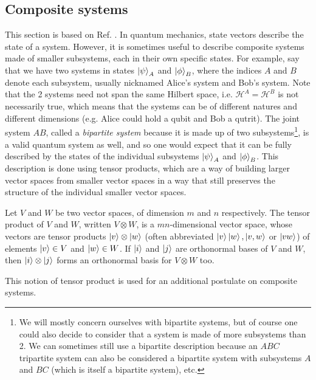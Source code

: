 \subsection{Composite systems}

This section is based on Ref. \cite[pp. 71--75, 93--96]{nielsen_quantum_2010}. In quantum mechanics, state vectors describe the state of a system. However, it is sometimes useful to describe composite systems made of smaller subsystems, each in their own specific states. For example, say that we have two systems in states $\ket{\psi}_A$ and $\ket{\phi}_B$, where the indices $A$ and $B$ denote each subsystem, usually nicknamed Alice's system and Bob's system. Note that the 2 systems need not span the same Hilbert space, i.e. $\mathcal{H}^A = \mathcal{H}^B$ is not necessarily true, which means that the systems can be of different natures and different dimensions (e.g. Alice could hold a qubit and Bob a qutrit). The joint system $AB$, called a \textit{bipartite system} because it is made up of two subsystems\footnote{We will mostly concern ourselves with bipartite systems, but of course one could also decide to consider that a system is made of more subsystems than 2. We can sometimes still use a bipartite description because an $ABC$ tripartite system can also be considered a bipartite system with subsystems $A$ and $BC$ (which is itself a bipartite system), etc.}, is a valid quantum system as well, and so one would expect that it can be fully described by the states of the individual subsystems $\ket{\psi}_A$ and $\ket{\phi}_B$. This description is done using tensor products, which are a way of building larger vector spaces from smaller vector spaces in a way that still preserves the structure of the individual smaller vector spaces.

\begin{definition}
    Let $V$ and $W$ be two vector spaces, of dimension $m$ and $n$ respectively. The tensor product of $V$ and $W$, written $V \otimes W$, is a $mn$-dimensional vector space, whose vectors are tensor products $\ket{v} \otimes \ket{w}$ (often abbreviated $\ket{v}\ket{w}, \ket{v, w}$ or $\ket{vw}$) of elements $\ket{v} \in V$ and $\ket{w} \in W$. If $\ket{i}$ and $\ket{j}$ are orthonormal bases of $V$ and $W$, then $\ket{i} \otimes \ket{j}$ forms an orthonormal basis for $V \otimes W$ too.
\end{definition}

\noindent This notion of tensor product is used for an additional postulate on composite systems.

